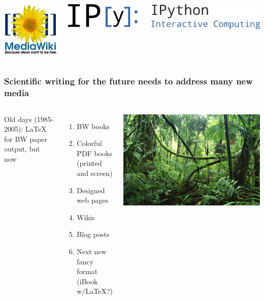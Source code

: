 \documentclass{beamer}
\begin{document}
\begin{frame}
\begin{columns}
\vspace{6mm}
\centerline{\includegraphics[width=0.2\linewidth]{testfigs/MediaWiki_logo.jpg}}
\vspace{6mm}

\vspace{6mm}
\centerline{\includegraphics[width=0.6\linewidth]{testfigs/IPython_logo.png}}
\vspace{6mm}

\end{columns}
\end{frame}

\begin{frame}
\frametitle{Scientific writing for the future needs to address many new media}

\begin{columns}
Old days (1985-2005): {\LaTeX} for BW paper output, but now
\begin{enumerate}
  \item BW books
  \item Colorful PDF books (printed and screen)
  \item Designed web pages
  \item Wikis
  \item Blog posts
  \item Next new fancy format (iBook w/LaTeX?)
\end{enumerate}
\noindent

\vspace{6mm}
\centerline{\includegraphics[width=0.9\linewidth]{testfigs/jungle_with_mess.jpg}}
\vspace{6mm}

\end{columns}
\end{frame}
\end{document}
